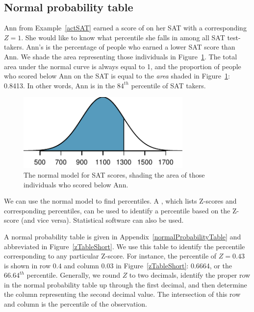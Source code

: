 \subsection{Normal probability table}

\begin{examplewrap}
\begin{nexample}{Ann from Example~\ref{actSAT} earned a score of \annsatscore{} on her SAT with a corresponding $Z=1$. She would like to know what percentile she falls in among all SAT test-takers.}
Ann's  is the percentage of people who earned a lower SAT score than Ann. We shade the area representing those individuals in Figure~\ref{satBelow1300}. The total area under the normal curve is always equal to 1, and the proportion of people who scored below Ann on the SAT is equal to the \emph{area} shaded in Figure~\ref{satBelow1300}: 0.8413. In other words, Ann is in the $84^{th}$ percentile of SAT takers.
\end{nexample}
\end{examplewrap}

\begin{figure}[htb]
   \centering
   \includegraphics[height=1.5in]{ch_distributions/figures/satBelow1300/satBelow1300}
   \caption{The normal model for SAT scores, shading the area of those individuals who scored below Ann.}
   \label{satBelow1300}
\end{figure}

We can use the normal model to find percentiles. A , which lists Z-scores and corresponding percentiles, can be used to identify a percentile based on the Z-score (and vice versa). Statistical software can also be used.

A normal probability table is given in Appendix~\vref{normalProbabilityTable} and abbreviated in Figure~\ref{zTableShort}. We use this table to identify the percentile corresponding to any particular Z-score. For instance, the percentile of $Z=0.43$ is shown in row $0.4$ and column $0.03$ in Figure~\ref{zTableShort}: 0.6664, or the $66.64^{th}$ percentile. Generally, we round $Z$ to two decimals, identify the proper row in the normal probability table up through the first decimal, and then determine the column representing the second decimal value. The intersection of this row and column is the percentile of the observation.

